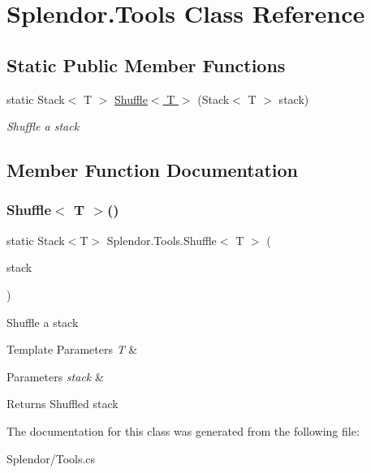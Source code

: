 \hypertarget{class_splendor_1_1_tools}{}\section{Splendor.\+Tools Class Reference}
\label{class_splendor_1_1_tools}
\subsection*{Static Public Member Functions}
\begin{DoxyCompactItemize}
\item 
static Stack$<$ T $>$ \hyperlink{class_splendor_1_1_tools_ae02d6833601c67579bc663056ef96a6b}{Shuffle$<$ T $>$} (Stack$<$ T $>$ stack)
\begin{DoxyCompactList}\small\item\em Shuffle a stack \end{DoxyCompactList}\end{DoxyCompactItemize}


\subsection{Member Function Documentation}
\mbox{\label{class_splendor_1_1_tools_ae02d6833601c67579bc663056ef96a6b}} 
\subsubsection{\texorpdfstring{Shuffle$<$ T $>$()}{Shuffle< T >()}}
{\footnotesize\ttfamily static Stack$<$T$>$ Splendor.\+Tools.\+Shuffle$<$ T $>$ (\begin{DoxyParamCaption}\item[{Stack$<$ T $>$}]{stack }\end{DoxyParamCaption})\hspace{0.3cm}{\ttfamily [static]}}



Shuffle a stack 


\begin{DoxyTemplParams}{Template Parameters}
{\em T} & \\
\hline
\end{DoxyTemplParams}

\begin{DoxyParams}{Parameters}
{\em stack} & \\
\hline
\end{DoxyParams}
\begin{DoxyReturn}{Returns}
Shuffled stack
\end{DoxyReturn}


The documentation for this class was generated from the following file\+:\begin{DoxyCompactItemize}
\item 
Splendor/Tools.\+cs\end{DoxyCompactItemize}
